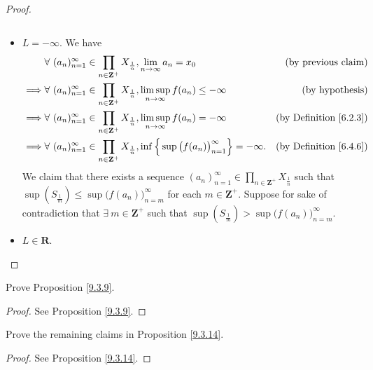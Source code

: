 \begin{proof}
\begin{itemize}
\[              \]
        \item \(L = -\infty\).
              We have
              \begin{align*}
                           & \forall\ (a_n)_{n = 1}^\infty \in \prod_{n \in \mathbf{Z}^+} X_{\frac{1}{n}}, \lim_{n \to \infty} a_n = x_0                                  & \text{(by previous claim)}         \\
                  \implies & \forall\ (a_n)_{n = 1}^\infty \in \prod_{n \in \mathbf{Z}^+} X_{\frac{1}{n}}, \limsup_{n \to \infty} f(a_n) \leq -\infty                     & \text{(by hypothesis)}             \\
                  \implies & \forall\ (a_n)_{n = 1}^\infty \in \prod_{n \in \mathbf{Z}^+} X_{\frac{1}{n}}, \limsup_{n \to \infty} f(a_n) = -\infty                        & \text{(by Definition \ref{6.2.3})} \\
                  \implies & \forall\ (a_n)_{n = 1}^\infty \in \prod_{n \in \mathbf{Z}^+} X_{\frac{1}{n}}, \inf\Big\{\sup\big(f(a_n)\big)_{n = 1}^\infty\Big\} = -\infty. & \text{(by Definition \ref{6.4.6})}
              \end{align*}
              We claim that there exists a sequence \((a_n)_{n = 1}^\infty \in \prod_{n \in \mathbf{Z}^+} X_{\frac{1}{n}}\) such that \(\sup(S_\frac{1}{m}) \leq \sup\big(f(a_n)\big)_{n = m}^\infty\) for each \(m \in \mathbf{Z}^+\).
              Suppose for sake of contradiction that \(\exists\ m \in \mathbf{Z}^+\) such that \(\sup(S_\frac{1}{m}) > \sup\big(f(a_n)\big)_{n = m}^\infty\).
        \item \(L \in \mathbf{R}\).
    \end{itemize}
\end{proof}

\exercisesection

\begin{exercise}\label{ex 9.3.1}
    Prove Proposition \ref{9.3.9}.
\end{exercise}

\begin{proof}
    See Proposition \ref{9.3.9}.
\end{proof}

\begin{exercise}\label{ex 9.3.2}
    Prove the remaining claims in Proposition \ref{9.3.14}.
\end{exercise}

\begin{proof}
    See Proposition \ref{9.3.14}.
\end{proof}

